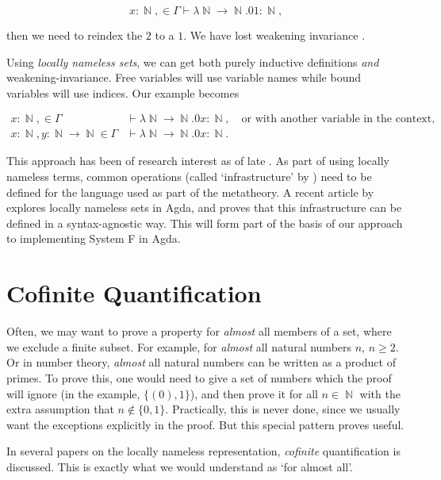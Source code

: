 \documentclass[logo,bsc,singlespacing,parskip,online]{infthesis}
\DeclareMathOperator{\nat}{\mathbb{N}}
\begin{document}
\begin{equation*}
  x \colon \nat, \in \Gamma \vdash \lambda \nat \to \nat. 0 1 \colon \nat,
\end{equation*}

then we need to reindex the $2$ to a $1$. We have lost weakening invariance
\citep{aydemir_engineering_2008}.

Using \textit{locally nameless sets}, we can get both purely inductive
definitions \textit{and} weakening-invariance. Free variables will use variable
names while bound variables will use indices. Our example becomes

\begin{align*}
  x \colon \nat, \in \Gamma &\vdash \lambda \nat \to \nat. 0 x \colon \nat,\quad \text{or with another variable in the context,}\\
  x \colon \nat, y \colon \nat \to \nat \in \Gamma &\vdash \lambda \nat \to \nat. 0 x \colon \nat.
\end{align*}

This approach has been of research interest as of late \citep{aydemir_engineering_2008}
\citep{chargueraud_locally_2012}. As part of using locally nameless terms, common operations (called
`infrastructure' by ) need to be defined for the language used as part of the metatheory. A recent
article by explores locally nameless sets in Agda, and proves that this infrastructure can be
defined in a syntax-agnostic way. This will form part of the basis of our approach to implementing
System F in Agda.

\section{Cofinite Quantification}

Often, we may want to prove a property for \textit{almost} all members of a set, where we exclude a
finite subset. For example, for \textit{almost} all natural numbers $n$, $n \geq 2$. Or in number
theory, \textit{almost} all natural numbers can be written as a product of primes. To prove this,
one would need to give a set of numbers which the proof will ignore (in the example, $\{ (0), 1
\}$), and then prove it for all $n \in \nat$ with the extra assumption that $n \not \in \{0, 1\}$.
Practically, this is never done, since we usually want the exceptions explicitly in the proof. But
this special pattern proves useful.

In several papers on the locally nameless representation, \textit{cofinite} quantification is
discussed. This is exactly what we would understand as `for almost all'.
\end{document}
